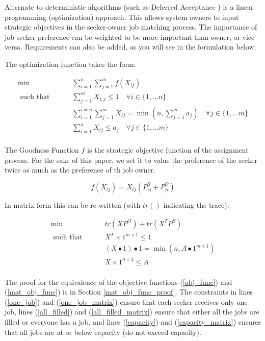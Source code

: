 Alternate to deterministic algorithms (such as Deferred Acceptance \cite{1962_Gale}) is a linear programming (optimization) approach. This allows system owners to input strategic objectives in the seeker-owner job matching process. The importance of job seeker preference can be weighted to be more important than owner, or vice versa. Requirements can also be added, as you will see in the formulation below.

The optimization function takes the form:

\begin{align}
\min \qquad & \sum_{i = 1}^{n} \sum_{j = 1}^{m} f(X_{ij}) \label{obj_func}\\
\text{ such that } \qquad & \sum_{j=1}^m X_{i,j} \leq 1 \quad  \forall i \in \{1, \dots n\} \label{one_job}\\
& \sum_{i = 1}^{i=n} \sum_{j = 1}^{m}X_{ij} = \min \left(n,\sum_{j = 1}^{m}a_j \right) \quad  \forall j \in \{1, \dots m\}  \label{all_filled}\\
& \sum_{i=1}^n X_{ij} \leq a_j \quad  \forall j \in \{1, \dots m\} \label{capacity} \\
\end{align}

The Goodness Function $f$ is the strategic objective function of the assignment process. For the sake of this paper, we set it to value the preference of the seeker twice as much as the preference of th job owner.

\[f(X_{ij}) = X_{ij}(P^S_{ij} + P^O_{ji})\]

In matrix form this can be re-written (with $tr()$ indicating the trace):

\begin{align}
\min \qquad & tr(XP^O) + tr(X^TP^S) \label{mat_obj_func} \\
\text{ such that } \qquad & X^T \times 1^{m \times 1}  \leq 1  \label{one_job_matrix}\\
& (X \bullet 1)\bullet 1 = \min(n,A \bullet 1^{m \times 1}) \label{all_filled_matrix}\\
& X \times 1^{n \times 1} \leq A \label{capacity_matrix} \\
\end{align}

The proof for the equivalence of the objective functions (\ref{obj_func}) and (\ref{mat_obj_func}) is in Section \ref{mat_obj_func_proof}. The constraints in lines (\ref{one_job}) and (\ref{one_job_matrix}) ensure that each seeker receives only one job, lines (\ref{all_filled}) and (\ref{all_filled_matrix}) ensure that either all the jobs are filled or everyone has a job, and lines (\ref{capacity}) and (\ref{capacity_matrix}) ensures that all jobs are at or below capacity (do not exceed capacity).

